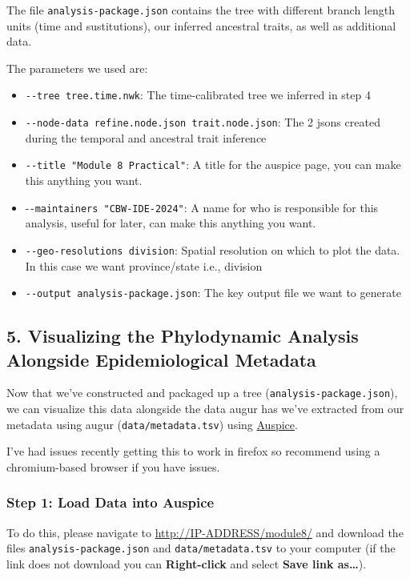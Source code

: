 \documentclass[
]{book}
\providecommand{\tightlist}{%
  \setlength{\itemsep}{0pt}\setlength{\parskip}{0pt}}
\begin{document}
The file \texttt{analysis-package.json} contains the tree with different branch length units (time and sustitutions), our inferred ancestral traits, as well as additional data.

The parameters we used are:

\begin{itemize}
\tightlist
\item
  \texttt{-\/-tree\ tree.time.nwk}: The time-calibrated tree we inferred in step 4
\item
  \texttt{-\/-node-data\ refine.node.json\ trait.node.json}: The 2 jsons created during the temporal and ancestral trait inference
\item
  \texttt{-\/-title\ "Module\ 8\ Practical"}: A title for the auspice page, you can make this anything you want.
\item
  -\texttt{-maintainers\ "CBW-IDE-2024"}: A name for who is responsible for this analysis, useful for later, can make this anything you want.
\item
  \texttt{-\/-geo-resolutions\ division}: Spatial resolution on which to plot the data. In this case we want province/state i.e., division
\item
  \texttt{-\/-output\ analysis-package.json}: The key output file we want to generate
\end{itemize}

\subsection{5. Visualizing the Phylodynamic Analysis Alongside Epidemiological Metadata}\label{visualizing-the-phylodynamic-analysis-alongside-epidemiological-metadata}

Now that we've constructed and packaged up a tree (\texttt{analysis-package.json}), we can visualize this data alongside the data augur has we've extracted from our metadata using augur (\texttt{data/metadata.tsv}) using \href{https://auspice.us/}{Auspice}.

I've had issues recently getting this to work in firefox so recommend using a chromium-based browser if you have issues.

\subsubsection{Step 1: Load Data into Auspice}\label{step-1-load-data-into-auspice}

To do this, please navigate to \url{http://IP-ADDRESS/module8/} and download the files \texttt{analysis-package.json} and \texttt{data/metadata.tsv} to your computer (if the link does not download you can \textbf{Right-click} and select \textbf{Save link as\ldots{}}).
\end{document}
